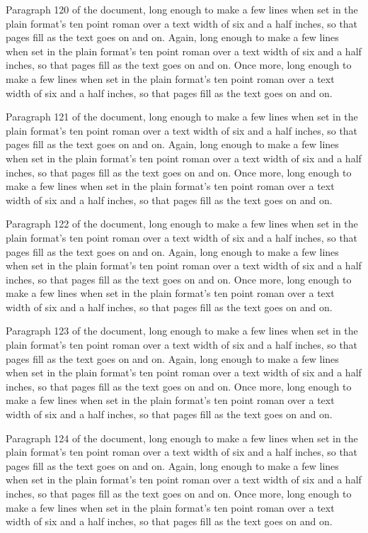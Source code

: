 Paragraph 120 of the document, long enough to make a few lines when set in the plain format's ten point roman over a text width of six and a half inches, so that pages fill as the text goes on and on. Again, long enough to make a few lines when set in the plain format's ten point roman over a text width of six and a half inches, so that pages fill as the text goes on and on. Once more, long enough to make a few lines when set in the plain format's ten point roman over a text width of six and a half inches, so that pages fill as the text goes on and on.

Paragraph 121 of the document, long enough to make a few lines when set in the plain format's ten point roman over a text width of six and a half inches, so that pages fill as the text goes on and on. Again, long enough to make a few lines when set in the plain format's ten point roman over a text width of six and a half inches, so that pages fill as the text goes on and on. Once more, long enough to make a few lines when set in the plain format's ten point roman over a text width of six and a half inches, so that pages fill as the text goes on and on.

Paragraph 122 of the document, long enough to make a few lines when set in the plain format's ten point roman over a text width of six and a half inches, so that pages fill as the text goes on and on. Again, long enough to make a few lines when set in the plain format's ten point roman over a text width of six and a half inches, so that pages fill as the text goes on and on. Once more, long enough to make a few lines when set in the plain format's ten point roman over a text width of six and a half inches, so that pages fill as the text goes on and on.

Paragraph 123 of the document, long enough to make a few lines when set in the plain format's ten point roman over a text width of six and a half inches, so that pages fill as the text goes on and on. Again, long enough to make a few lines when set in the plain format's ten point roman over a text width of six and a half inches, so that pages fill as the text goes on and on. Once more, long enough to make a few lines when set in the plain format's ten point roman over a text width of six and a half inches, so that pages fill as the text goes on and on.

Paragraph 124 of the document, long enough to make a few lines when set in the plain format's ten point roman over a text width of six and a half inches, so that pages fill as the text goes on and on. Again, long enough to make a few lines when set in the plain format's ten point roman over a text width of six and a half inches, so that pages fill as the text goes on and on. Once more, long enough to make a few lines when set in the plain format's ten point roman over a text width of six and a half inches, so that pages fill as the text goes on and on.

